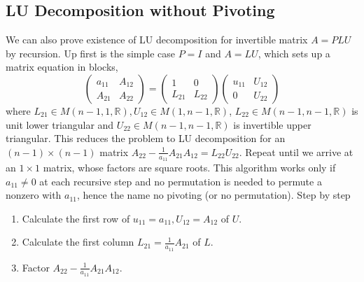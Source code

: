 \documentclass[12pt]{amsart}
\theoremstyle{definition}
\begin{document}
\subsection{LU Decomposition without Pivoting} We can also prove existence of LU decomposition for invertible matrix $A = PLU$ by recursion. Up first is the simple case $P = I$ and $A = LU$, which sets up a matrix equation in blocks,
$$\left(\begin{array}{cc} a_{11} & A_{12} \\ A_{21} & A_{22} \end{array}\right) = \left(\begin{array}{cc} 1 & 0 \\ L_{21} & L_{22} \end{array}\right)\left(\begin{array}{cc} u_{11} & U_{12} \\ 0 & U_{22} \end{array}\right)$$
where $L_{21} \in M(n-1,1, \mathbb{R}), U_{12} \in M(1, n-1, \mathbb{R})$, $L_{22} \in M(n-1, n-1, \mathbb{R})$ is unit lower triangular and $U_{22} \in M(n-1, n-1, \mathbb{R})$ is invertible upper triangular. This reduces the problem to LU decomposition for an $(n-1) \times (n-1)$ matrix $A_{22} - \frac{1}{a_{11}}A_{21}A_{12} = L_{22}U_{22}$. Repeat until we arrive at an $1 \times 1$ matrix, whose factors are square roots. This algorithm works only if $a_{11} \neq 0$ at each recursive step and no permutation is needed to permute a nonzero with $a_{11}$, hence the name no pivoting (or no permutation). Step by step
\begin{enumerate}[\indent 1.]
\item Calculate the first row of $u_{11} = a_{11}, U_{12} = A_{12}$ of $U$.
\item Calculate the first column $L_{21} = \frac{1}{a_{11}} A_{21}$ of $L$.
\item Factor $A_{22} - \frac{1}{a_{11}}A_{21}A_{12}$.
\end{enumerate}
\end{document}
